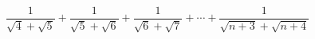 $\dfrac{1}{\sqrt{4}+\sqrt{5}}+\dfrac{1}{\sqrt{5}+\sqrt{6}}+\dfrac{1}{\sqrt{6}+\sqrt{7}}+\cdots+\dfrac{1}{\sqrt{n+3}+\sqrt{n+4}}$
